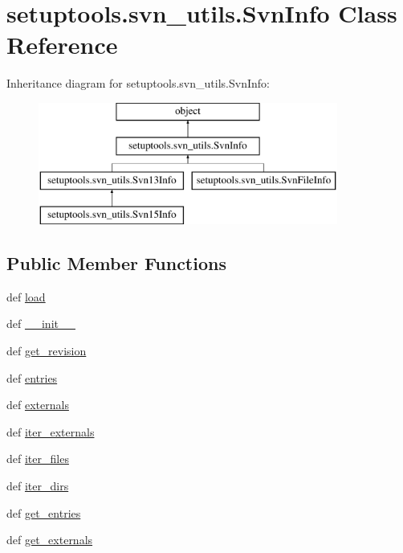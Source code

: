 \hypertarget{classsetuptools_1_1svn__utils_1_1SvnInfo}{}\section{setuptools.\+svn\+\_\+utils.\+Svn\+Info Class Reference}
\label{classsetuptools_1_1svn__utils_1_1SvnInfo}
Inheritance diagram for setuptools.\+svn\+\_\+utils.\+Svn\+Info\+:\begin{figure}[H]
\begin{center}
\leavevmode
\includegraphics[height=4.000000cm]{classsetuptools_1_1svn__utils_1_1SvnInfo}
\end{center}
\end{figure}
\subsection*{Public Member Functions}
\begin{DoxyCompactItemize}
\item 
def \hyperlink{classsetuptools_1_1svn__utils_1_1SvnInfo_a42a2a598f3df7e8477094d2b55364678}{load}
\item 
def \hyperlink{classsetuptools_1_1svn__utils_1_1SvnInfo_a60e9dcbaab938486767692c1981a6873}{\+\_\+\+\_\+init\+\_\+\+\_\+}
\item 
def \hyperlink{classsetuptools_1_1svn__utils_1_1SvnInfo_a65daf771ce7ce46513152da9b42fd7fd}{get\+\_\+revision}
\item 
def \hyperlink{classsetuptools_1_1svn__utils_1_1SvnInfo_a4191c2015fa5b95add8bfd90c048e794}{entries}
\item 
def \hyperlink{classsetuptools_1_1svn__utils_1_1SvnInfo_a052c85c3c84c32107952ffeaff9bc8ee}{externals}
\item 
def \hyperlink{classsetuptools_1_1svn__utils_1_1SvnInfo_a74f51983196dfd320f54ff1e5a8fe7f9}{iter\+\_\+externals}
\item 
def \hyperlink{classsetuptools_1_1svn__utils_1_1SvnInfo_a03de14feb7b5f4509349e1e75c6fbd37}{iter\+\_\+files}
\item 
def \hyperlink{classsetuptools_1_1svn__utils_1_1SvnInfo_a55cd4c3abd16a91175a50f77dbd8ba1b}{iter\+\_\+dirs}
\item 
def \hyperlink{classsetuptools_1_1svn__utils_1_1SvnInfo_a58d18af5e18f2d5e7b0d31ff91511b7f}{get\+\_\+entries}
\item 
def \hyperlink{classsetuptools_1_1svn__utils_1_1SvnInfo_a11d357ab3abb965756633a3d8e616fd9}{get\+\_\+externals}
\end{DoxyCompactItemize}
